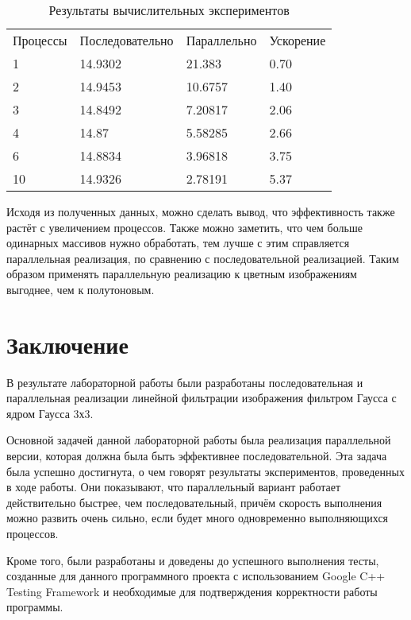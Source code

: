 \documentclass{report}
\begin{document}
\begin{table}[!h]
\caption{Результаты вычислительных экспериментов}
\centering
\begin{tabular}{p{3cm} p{4cm} p{4cm} p{4cm}}
Процессы & Последовательно & Параллельно & Ускорение  \\
1        & 14.9302          & 21.383     & 0.70       \\
2        & 14.9453         & 10.6757     & 1.40       \\
3        & 14.8492         & 7.20817     & 2.06       \\
4        & 14.87         & 5.58285     & 2.66       \\
6        & 14.8834         & 3.96818     & 3.75       \\
10        & 14.9326         & 2.78191     & 5.37
\end{tabular}
\end{table}

\par Исходя из полученных данных, можно сделать вывод, что эффективность также растёт с увеличением процессов. Также можно заметить, что чем больше одинарных массивов нужно обработать, тем лучше с этим справляется параллельная реализация, по сравнению с последовательной реализацией. Таким образом применять параллельную реализацию к цветным изображениям выгоднее, чем к полутоновым.
\newpage

\section*{Заключение}
В результате лабораторной работы были разработаны последовательная и параллельная реализации линейной фильтрации изображения фильтром Гаусса с ядром Гаусса 3х3.
\par Основной задачей данной лабораторной работы была реализация параллельной версии, которая должна была быть эффективнее последовательной. Эта задача была успешно достигнута, о чем говорят результаты экспериментов, проведенных в ходе работы. Они показывают, что параллельный вариант работает действительно быстрее, чем последовательный, причём скорость выполнения можно развить очень сильно, если будет много одновременно выполняющихся процессов.
\par Кроме того, были разработаны и доведены до успешного выполнения тесты, созданные для данного программного проекта с использованием Google C++ Testing Framework и необходимые для подтверждения корректности работы программы.
\newpage
\end{document}
